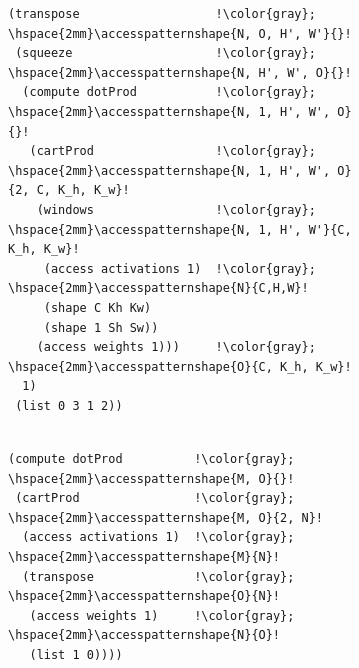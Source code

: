 \documentclass[prologue, dvipsnames, sigplan, screen, review, anonymous]{acmart}
\newcommand{\accesspatternshape}[2]{$($$\left( #1 \right)$, $\left( #2 \right)$$)$}
\begin{document}
\begin{figure}
\begin{minipage}{.54\textwidth}
\begin{subfigure}{\textwidth}
\begin{lstlisting}[escapechar=!]
(transpose                   !\color{gray}; \hspace{2mm}\accesspatternshape{N, O, H', W'}{}!
 (squeeze                    !\color{gray}; \hspace{2mm}\accesspatternshape{N, H', W', O}{}!
  (compute dotProd           !\color{gray}; \hspace{2mm}\accesspatternshape{N, 1, H', W', O}{}!
   (cartProd                 !\color{gray}; \hspace{2mm}\accesspatternshape{N, 1, H', W', O}{2, C, K_h, K_w}!
    (windows                 !\color{gray}; \hspace{2mm}\accesspatternshape{N, 1, H', W'}{C, K_h, K_w}!
     (access activations 1)  !\color{gray}; \hspace{2mm}\accesspatternshape{N}{C,H,W}!
     (shape C Kh Kw)
     (shape 1 Sh Sw))
    (access weights 1)))     !\color{gray}; \hspace{2mm}\accesspatternshape{O}{C, K_h, K_w}!
  1)
 (list 0 3 1 2))
 
     \end{lstlisting}
       \vspace{-1.5em}
    \label{fig:conv2d}
\end{subfigure}
\end{minipage}
\begin{minipage}{.45\textwidth}

\begin{subfigure}{\textwidth}
\begin{lstlisting}[escapechar=!]
(compute dotProd          !\color{gray}; \hspace{2mm}\accesspatternshape{M, O}{}!
 (cartProd                !\color{gray}; \hspace{2mm}\accesspatternshape{M, O}{2, N}!
  (access activations 1)  !\color{gray}; \hspace{2mm}\accesspatternshape{M}{N}!
  (transpose              !\color{gray}; \hspace{2mm}\accesspatternshape{O}{N}!
   (access weights 1)     !\color{gray}; \hspace{2mm}\accesspatternshape{N}{O}!
   (list 1 0))))
  \end{lstlisting}
  \vspace{-1.5em} 
  \label{fig:mat-mat-mult}
\end{subfigure}


\end{minipage}
\end{figure}
\end{document}
